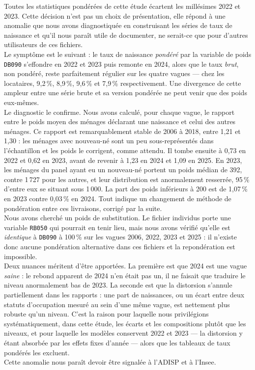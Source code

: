 \documentclass[12pt,a4paper]{article}
\begin{document}
	Toutes les statistiques pondérées de cette étude écartent les millésimes 2022 et 2023. Cette décision n'est pas un choix de présentation, elle répond à une anomalie que nous avons diagnostiquée en construisant les séries de taux de naissance et qu'il nous paraît utile de documenter, ne serait-ce que pour d'autres utilisateurs de ces fichiers. \\

	\noindent Le symptôme est le suivant : le taux de naissance \textit{pondéré} par la variable de poids \texttt{DB090} s'effondre en 2022 et 2023 puis remonte en 2024, alors que le taux \textit{brut}, non pondéré, reste parfaitement régulier sur les quatre vagues — chez les locataires, 9,2\,\%, 8,9\,\%, 9,6\,\% et 7,9\,\% respectivement. Une divergence de cette ampleur entre une série brute et sa version pondérée ne peut venir que des poids eux-mêmes. \\

	\noindent Le diagnostic le confirme. Nous avons calculé, pour chaque vague, le rapport entre le poids moyen des ménages déclarant une naissance et celui des autres ménages. Ce rapport est remarquablement stable de 2006 à 2018, entre 1,21 et 1,30 : les ménages avec nouveau-né sont un peu sous-représentés dans l'échantillon et les poids le corrigent, comme attendu. Il tombe ensuite à 0,73 en 2022 et 0,62 en 2023, avant de revenir à 1,23 en 2024 et 1,09 en 2025. En 2023, les ménages du panel ayant eu un nouveau-né portent un poids médian de 392, contre 1\,727 pour les autres, et leur distribution est anormalement resserrée, 95\,\% d'entre eux se situant sous 1\,000. La part des poids inférieurs à 200 est de 1,07\,\% en 2023 contre 0,03\,\% en 2024. Tout indique un changement de méthode de pondération entre ces livraisons, corrigé par la suite. \\

	\noindent Nous avons cherché un poids de substitution. Le fichier individus porte une variable \texttt{RB050} qui pourrait en tenir lieu, mais nous avons vérifié qu'elle est \textit{identique} à \texttt{DB090} à 100\,\% sur les vagues 2006, 2022, 2023 et 2025 : il n'existe donc aucune pondération alternative dans ces fichiers et la repondération est impossible. \\

	\noindent Deux nuances méritent d'être apportées. La première est que 2024 est une vague \textit{saine} : le rebond apparent de 2024 n'en était pas un, il ne faisait que traduire le niveau anormalement bas de 2023. La seconde est que la distorsion s'annule partiellement dans les rapports : une part de naissances, ou un écart entre deux statuts d'occupation mesuré au sein d'une même vague, est nettement plus robuste qu'un niveau. C'est la raison pour laquelle nous privilégions systématiquement, dans cette étude, les écarts et les compositions plutôt que les niveaux, et pour laquelle les modèles conservent 2022 et 2023 — la distorsion y étant absorbée par les effets fixes d'année — alors que les tableaux de taux pondérés les excluent. \\

	\noindent Cette anomalie nous paraît devoir être signalée à l'ADISP et à l'Insee.
\end{document}
